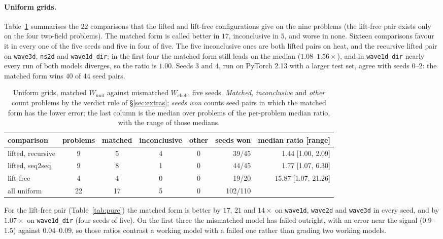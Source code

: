 \documentclass[11pt]{article}
\theoremstyle{definition}
\theoremstyle{remark}
\newcommand{\Wc}{W_{\mathrm{cheb}}}
\newcommand{\Wu}{W_{\mathrm{unif}}}
\begin{document}
\paragraph{Uniform grids.} Table~\ref{tab:forms-uniform} summarises the
$22$ comparisons that the lifted and lift-free configurations give on the nine
problems (the lift-free pair exists only on the four two-field problems). The
matched form is called better in $17$, inconclusive in $5$, and worse in none.
Sixteen comparisons favour it in every one of the five seeds and five in four of
five. The five inconclusive ones are both lifted pairs on heat, and the recursive
lifted pair on \texttt{wave3d}, \texttt{ns2d} and \texttt{wave1d\_dir}; in the
first four the matched form still leads on the median ($1.08$--$1.56\times$), and
in \texttt{wave1d\_dir} nearly every run of both models diverges, so the ratio is
$1.00$. Seeds $3$ and $4$, run on PyTorch 2.13 with a larger test set, agree with
seeds $0$--$2$: the matched form wins $40$ of $44$ seed pairs.

\begin{table}[htbp]
\centering
\caption{Uniform grids, matched $\Wu$ against mismatched $\Wc$, five seeds.
\emph{Matched}, \emph{inconclusive} and \emph{other} count problems by the
verdict rule of \S\ref{sec:extras}; \emph{seeds won} counts seed pairs in which
the matched form has the lower error; the last column is the median over
problems of the per-problem median ratio, with the range of those medians.}
\label{tab:forms-uniform}
\small
\begin{tabular}{@{}lccccrr@{}}
\toprule
comparison & problems & matched & inconclusive & other & seeds won & median ratio [range] \\
\midrule
lifted, recursive & 9 & 5 & 4 & 0 & 39/45 & 1.44 [1.00, 2.09] \\
lifted, seq2seq & 9 & 8 & 1 & 0 & 44/45 & 1.77 [1.07, 6.30] \\
lift-free & 4 & 4 & 0 & 0 & 19/20 & 15.87 [1.07, 21.26] \\
\midrule
all uniform & 22 & 17 & 5 & 0 & 102/110 & \\
\bottomrule
\end{tabular}
\end{table}

For the lift-free pair (Table~\ref{tab:pure}) the matched form is better by
$17$, $21$ and $14\times$ on \texttt{wave1d}, \texttt{wave2d} and
\texttt{wave3d} in every seed, and by $1.07\times$ on \texttt{wave1d\_dir}
(four seeds of five). On the first three the mismatched model has failed
outright, with an error near the signal ($0.9$--$1.5$) against $0.04$--$0.09$,
so those ratios contrast a working model with a failed one rather than grading
two working models.
\end{document}
